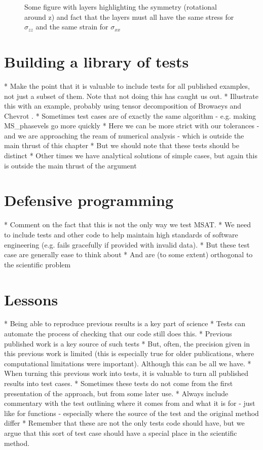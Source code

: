 \documentclass[11pt, oneside]{article}   	%
\begin{document}
\begin{figure}[htbp]
   \centering
   \caption{Some figure with layers highlighting the symmetry (rotational around z) 
                 and fact that the layers must all have the same stress for $\sigma_{zz}$
                 and the same strain for $\sigma_{xx}$}
   \label{fig:backus}
\end{figure}

\section{Building a library of tests}

* Make the point that it is valuable to include tests for all published
examples, not just a subset of them. Note that not doing this has caught
us out. 
* Illustrate this with an example, probably using tensor decomposition 
of Browaeys and Chevrot \cite{Browaeys2004}.
* Sometimes test cases are of exactly the same algorithm - e.g. making
MS\_phasevels go more quickly
* Here we can be more strict with our tolerances - and we are approaching 
the ream of numerical analysis - which is outside the main thrust of this chapter
* But we should note that these tests should be distinct
* Other times we have analytical solutions of simple cases, but again this is 
outside the main thrust of the argument

\section{Defensive programming}

* Comment on the fact that this is not the only way we test MSAT.
* We need to include tests and other code to help maintain high 
standards of software engineering (e.g. fails gracefully if provided 
with invalid data).
* But these test case are generally ease to think about
* And are (to some extent) orthogonal to the scientific problem

\section{Lessons}

* Being able to reproduce previous results is a key part of science
* Tests can automate the process of checking that our code still does 
this.
* Previous published work is a key source of such tests
* But, often, the precision given in this previous work is limited (this
is especially true for older publications, where computational limitations 
were important). Although this can be all we have.
* When turning this previous work into tests, it is valuable to turn all
published results into test cases.
* Sometimes these tests do not come from the first presentation of the 
approach, but from some later use.
* Always include commentary with the test outlining where it comes from
and what it is for - just like for functions - especially where the source of the 
test and the original method differ
* Remember that these are not the only tests code should have, but we
argue that this sort of test case should have a special place in the scientific
method.


 
\end{document}
